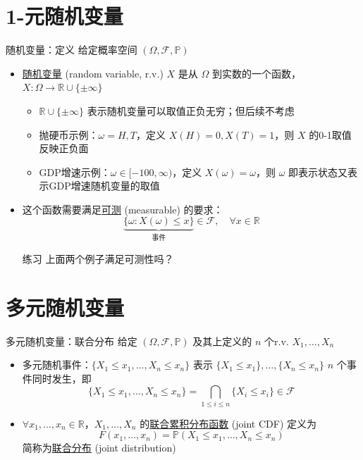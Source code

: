 \documentclass[notheorems,handout]{beamer}
\theoremstyle{mydefstyle}\newtheorem{definition}{定义}
\theoremstyle{mydefstyle}\newtheorem*{assumption}{假设}
\theoremstyle{mythmstyle}\newtheorem{theorem}{定理}
\theoremstyle{mythmstyle}\newtheorem{proposition}{命题}
\theoremstyle{mythmstyle}\newtheorem{lemma}{引理}
\theoremstyle{myrmkstyle}\newtheorem*{remark}{注}
\renewcommand{\P}{\mathbb{P}}
\newcommand{\F}{\mathcal{F}}
\newcommand{\R}{\mathbb{R}}
\begin{document}
\section{1-元随机变量}
\begin{frame}{随机变量：定义}
给定概率空间 $(\Omega,\F,\P)$
\begin{itemize}
\item
\underline{随机变量} (random variable, r.v.) $X$ 是从 $\Omega$ 到实数的一个函数，$X:\Omega \rightarrow \R\cup \{\pm\infty\}$
	\begin{itemize}
	\item
	$\R\cup\{\pm\infty\}$ 表示随机变量可以取值正负无穷；但后续不考虑
	\item
	抛硬币示例：$\omega = H,T$，定义 $X(H) = 0,X(T) = 1$，则 $X$ 的0-1取值反映正负面
	\item
	GDP增速示例：$\omega \in[-100,\infty)$，定义 $X(\omega) = \omega$，则 $\omega$ 即表示状态又表示GDP增速随机变量的取值
	\end{itemize}
\item
这个函数需要满足\underline{可测} (measurable) 的要求：
$$
\underbrace{\{\omega: X(\omega) \le x\}}_{\text{事件}}\in\F,\quad \forall x\in\R
$$
\item[\kaishu 练习]
上面两个例子满足可测性吗？
\end{itemize}
\end{frame}



\section{多元随机变量}
\begin{frame}{多元随机变量：联合分布}
给定 $(\Omega,\F,\P)$ 及其上定义的 $n$ 个r.v. $X_1,\ldots,X_n$
\begin{itemize}
\item
多元随机事件：$\{X_1\le x_1,\ldots,X_n \le x_n\}$ 表示 $\{X_1\le x_1\},\ldots,\{X_n\le x_n\}$ $n$ 个事件同时发生，即
$$
\{X_1\le x_1,\ldots,X_n \le x_n\} = \bigcap_{1\le i\le n}\{X_i\le x_i\}\in\F
$$
\item
$\forall x_1,\ldots,x_n\in\R$，$X_1,\ldots,X_n$ 的\underline{联合累积分布函数} (joint CDF) 定义为
$$
F(x_1,\ldots,x_n) = \P(X_1\le x_1,\ldots,X_n \le x_n)
$$
简称为\underline{联合分布} (joint distribution)
\end{itemize}
\end{frame}
\end{document}
